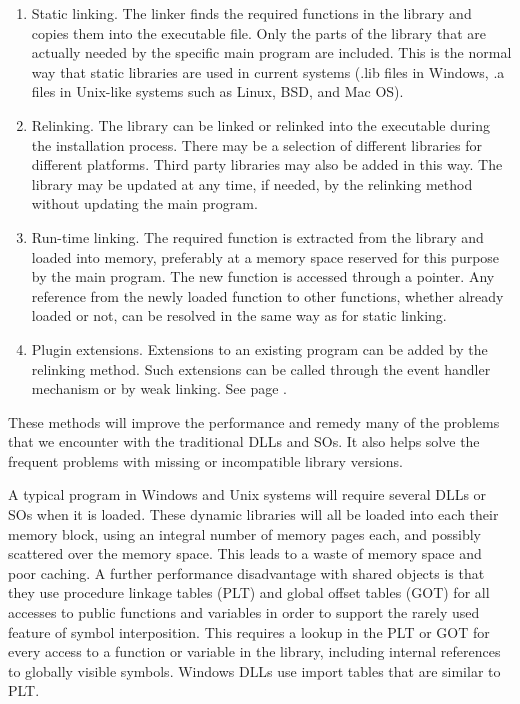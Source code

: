 \documentclass[forwardcom.tex]{subfiles}
\begin{document}
\begin{enumerate}
\item Static linking. \label{staticLinking} The linker finds the required functions in the library and copies them into the executable file. Only the parts of the library that are actually needed by the specific main program are included. This is the normal way that static libraries are used in current systems (.lib files in Windows, .a files in Unix-like systems such as Linux, BSD, and Mac OS). 

\item  Relinking. \label{InstallationReLinking} The library can be linked or relinked into the executable during the installation process. There may be a selection of different libraries for different platforms. Third party libraries may also be added in this way.
The library may be updated at any time, if needed, by the relinking method without updating the main program.

\item  Run-time linking. \label{runtimeLinking} The required function is extracted from the library and loaded into memory, preferably at a memory space reserved for this purpose by the main program. 
The new function is accessed through a pointer. 
Any reference from the newly loaded function to other functions, whether already loaded or not, can be resolved in the same way as for static linking. 

\item  Plugin extensions. \label{addOnExtensions} Extensions to an existing program can be added by the relinking method. Such extensions can be called through the event handler mechanism or by weak linking. See page \pageref{AddingAPlugin}.
\end{enumerate}

These methods will improve the performance and remedy many of the problems that we encounter with the traditional DLLs and SOs. It also helps solve the frequent problems with missing or incompatible library versions.
\vv

A typical program in Windows and Unix systems will require several DLLs or SOs when it is loaded. These dynamic libraries will all be loaded into each their memory block, using an integral number of memory pages each, and possibly scattered over the memory space. This leads to a waste of memory space and poor caching. A further performance disadvantage with shared objects is that they use procedure linkage tables (PLT) and global offset tables (GOT) for all accesses to public functions and variables in order to support the rarely used feature of symbol interposition. This requires a lookup in the PLT or GOT for every access to a function or variable in the library, including internal references to globally visible symbols. 
Windows DLLs use import tables that are similar to PLT.
\vv
\end{document}
